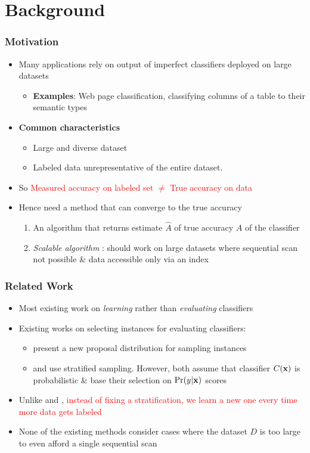 \documentclass[11pt]{beamer}
\newcommand{\vek}[1]{{\bf {#1}}}
\newcommand{\vx}{{\vek{x}}}
\newcommand{\TP}{{A}}
\newcommand{\estPerf}{{\hat{A}}}
\newlength{\wideitemsep}
\let\olditem\item
\renewcommand{\item}{\setlength{\itemsep}{\wideitemsep}\olditem}
\begin{document}
\section{Background}
\begin{frame}
\frametitle{Motivation}
\begin{itemize}
\item Many applications rely on output of imperfect classifiers deployed on large datasets \\ 
\begin{itemize}
\item \textbf{Examples}: Web page classification, classifying columns of a table to their semantic types
\end{itemize}
\item \textbf{Common characteristics} 
\begin{itemize}
\item Large and diverse dataset 
\item Labeled data unrepresentative of the entire dataset. 
\end{itemize}
\item So \textcolor{red}{Measured accuracy on labeled set $\neq$ True accuracy on data}
\item Hence need a method that can converge to the true accuracy
\begin{enumerate}
\item An algorithm that returns estimate $\estPerf$ of true accuracy $\TP$ of the classifier
\item \textit{Scalable algorithm} : should work on large datasets where sequential scan not possible \& data accessible only via an index
\end{enumerate} 
\end{itemize}
\end{frame}

\begin{frame}
\frametitle{Related Work}
\begin{itemize}
\item Most existing work on \textit{learning} rather than \textit{evaluating} classifiers
\item Existing works on selecting instances for evaluating classifiers:
\begin{itemize}
\item \citep{sawade10} present a new proposal distribution for sampling instances
\item \citep{bennett10} and \citep{druck11} use stratified sampling. However, both assume that classifier $C(\vx)$ is probabilistic \& base their selection on $\Pr(y|\vx)$ scores
\end{itemize}
\item Unlike \citep{bennett10} and \citep{druck11}, \textcolor{red}{instead of fixing a stratification, we learn a new one every time more data gets labeled}
\item None of the existing methods consider cases where the dataset $D$ is too large to even afford a single sequential scan %
\end{itemize}
\end{frame}
\end{document}
